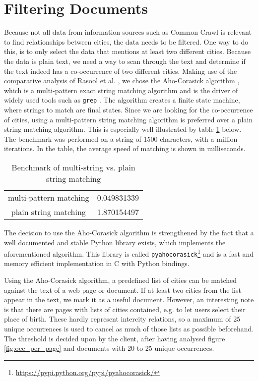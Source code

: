 \section{Filtering Documents} \label{sec:filtering_docs}
Because not all data from information sources such as Common Crawl is relevant to find relationships between cities, the data needs to be filtered. One way to do this, is to only select the data that mentions at least two different cities. Because the data is plain text, we need a way to scan through the text and determine if the text indeed has a co-occurrence of two different cities.
Making use of the comparative analysis of Rasool et al. \cite{rasool2012string}, we chose the Aho-Corasick algorithm \cite{Aho-Corasick}, which is a multi-pattern exact string matching algorithm and is the driver of widely used tools such as \texttt{grep} \cite{kernighan1984unix}. The algorithm creates a finite state machine, where strings to match are final states. Since we are looking for the co-occurrence of cities, using a multi-pattern string matching algorithm is preferred over a plain string matching algorithm. This is especially well illustrated by table \ref{tab:bm-matching} below. The benchmark was performed on a string of 1500 characters, with a million iterations. In the table, the average speed of matching is shown in milliseconds.

\begin{table}[H]
\centering
\begin{tabular}{ |c|c| } 
    \hline
    multi-pattern matching & 0.049831339 \\
    plain string matching &  1.870154497 \\
    \hline
\end{tabular}
\caption{Benchmark of multi-string vs. plain string matching}
\label{tab:bm-matching}
\end{table}

The decision to use the Aho-Corasick algorithm is strengthened by the fact that a well documented and stable Python library exists, which implements the aforementioned algorithm. This library is called \texttt{pyahocorasick}\footnote{\url{https://pypi.python.org/pypi/pyahocorasick/}} and is a fast and memory efficient implementation in C with Python bindings.

Using the Aho-Corasick algorithm, a predefined list of cities can be matched against the text of a web page or document. If at least two cities from the list appear in the text, we mark it as a useful document. However, an interesting note is that there are pages with lists of cities contained, e.g. to let users select their place of birth. These hardly represent intercity relations, so a maximum of 25 unique occurrences is used to cancel as much of those lists as possible beforehand. The threshold is decided upon by the client, after having analysed figure \ref{fig:occ_per_page} and documents with 20 to 25 unique occurrences.

